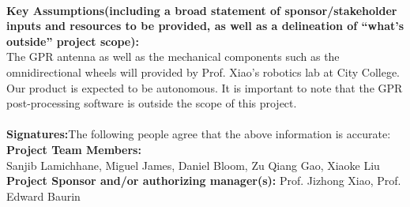 \\
\textbf{Key Assumptions(including a broad statement of sponsor/stakeholder inputs and resources to be provided, as well as a delineation of “what’s outside” project scope):}
\\
The GPR antenna as well as the mechanical components such as the omnidirectional wheels will provided by Prof. Xiao’s robotics lab at City College. Our product is expected to be autonomous. It is important to note that the GPR post-processing software is outside the scope of this project.\\
\\
\textbf{Signatures:}The following people agree that the above information is accurate:\\
\textbf{Project Team Members:}\\Sanjib Lamichhane, Miguel James, Daniel Bloom, Zu Qiang Gao, Xiaoke Liu\\
\textbf{Project Sponsor and/or authorizing manager(s):} Prof. Jizhong Xiao, Prof. Edward Baurin\\
\\
